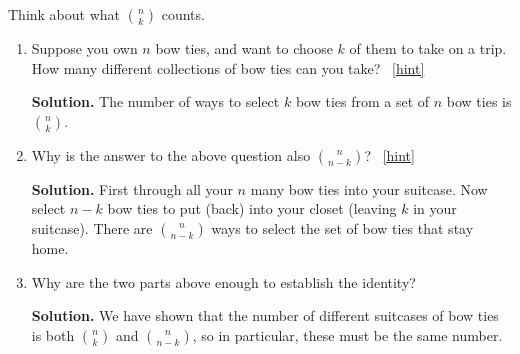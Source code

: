 \documentclass{book}
\begin{document}
\setcounter{project}{74}
\addtocounter{project}{-1}
\begin{activity}[]\label{act-pascalsym-dc}
\hypertarget{p-588}{}%
Think about what \(\binom{n}{k}\) counts.%
\begin{enumerate}[font=\bfseries,label=(\alph*),ref=\alph*]
\item\label{task-105} \hypertarget{p-589}{}%
Suppose you own \(n\) bow ties, and want to choose \(k\) of them to take on a trip.  How many different collections of bow ties can you take?%
~\hfill{\tiny\hyperlink{a-74.a}{[hint]}\hypertarget{q-74.a}{}}\par\smallskip%
\noindent\textbf{Solution.}\hypertarget{solution-56}{}\quad%
\hypertarget{p-591}{}%
The number of ways to select \(k\) bow ties from a set of \(n\) bow ties is \(\binom{n}{k}\).%
\item\label{task-106} \hypertarget{p-592}{}%
Why is the answer to the above question also \(\binom{n}{n-k}\)?%
~\hfill{\tiny\hyperlink{a-74.b}{[hint]}\hypertarget{q-74.b}{}}\par\smallskip%
\noindent\textbf{Solution.}\hypertarget{solution-57}{}\quad%
\hypertarget{p-594}{}%
First through all your \(n\) many bow ties into your suitcase.  Now select \(n-k\) bow ties to put (back) into your closet (leaving \(k\) in your suitcase).  There are \(\binom{n}{n-k}\) ways to select the set of bow ties that stay home.%
\item\label{task-107} \hypertarget{p-595}{}%
Why are the two parts above enough to establish the identity?%
\par\smallskip%
\noindent\textbf{Solution.}\hypertarget{solution-58}{}\quad%
\hypertarget{p-596}{}%
We have shown that the number of different suitcases of bow ties is both \(\binom{n}{k}\) and \(\binom{n}{n-k}\), so in particular, these must be the same number.%
\end{enumerate}
\end{activity}
\end{document}
